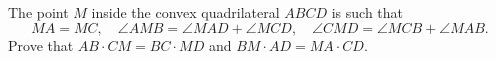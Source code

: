 The point $M$ inside the convex quadrilateral $ABCD$ is such that
\[ MA = MC, \quad \angle AMB = \angle MAD + \angle MCD, \quad \angle CMD = \angle MCB + \angle MAB. \]
Prove that $AB \cdot CM = BC \cdot MD$ and $BM \cdot AD = MA \cdot CD$.
